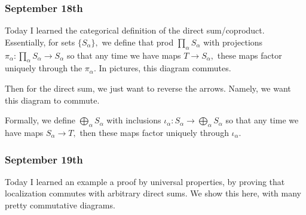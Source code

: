 \subsubsection{September 18th}
Today I learned the categorical definition of the direct sum/coproduct. Essentially, for sets $\{S_\alpha\},$ we define that prod $\prod_\alpha S_\alpha$ with projections $\pi_\alpha:\prod_\alpha S_\alpha\to S_\alpha$ so that any time we have maps $T\to S_\alpha,$ these maps factor uniquely through the $\pi_\alpha.$ In pictures, this diagram commutes.
\begin{center}
\end{center}
Then for the direct sum, we just want to reverse the arrows. Namely, we want this diagram to commute.
\begin{center}
\end{center}
Formally, we define $\bigoplus_\alpha S_\alpha$ with inclusions $\iota_\alpha:S_\alpha\to\bigoplus_\alpha S_\alpha$ so that any time we have maps $S_\alpha\to T,$ then these maps factor uniquely through $\iota_\alpha.$

\subsubsection{September 19th}
Today I learned an example a proof by universal properties, by proving that localization commutes with arbitrary direct sums. We show this here, with many pretty commutative diagrams.

